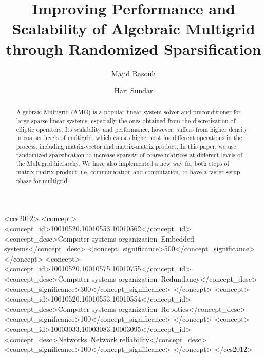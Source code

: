 \documentclass[sigconf]{acmart}
\begin{document}
\title{Improving Performance and Scalability of Algebraic Multigrid through Randomized Sparsification}

\author{Majid Rasouli}

\author{Hari Sundar}




\begin{abstract}
Algebraic Multigrid (AMG) is a popular linear system solver and preconditioner
for large sparse linear systems, especially the ones obtained from the discretization of elliptic operators. Its scalability and performance, however, suffers from higher density in coarser levels of multigrid, which causes higher cost for different operations in the process, including matrix-vector and matrix-matrix product.
In this paper, we use randomized sparsification to increase sparsity of coarse
matrices at different levels of the Multigrid hierarchy. We have also implemented
a new way for both steps of matrix-matrix product, i.e. communication and computation, to have a faster setup phase for multigrid.
\end{abstract}

%
%
\iffalse
\begin{CCSXML}
<ccs2012>
 <concept>
  <concept_id>10010520.10010553.10010562</concept_id>
  <concept_desc>Computer systems organization~Embedded systems</concept_desc>
  <concept_significance>500</concept_significance>
 </concept>
 <concept>
  <concept_id>10010520.10010575.10010755</concept_id>
  <concept_desc>Computer systems organization~Redundancy</concept_desc>
  <concept_significance>300</concept_significance>
 </concept>
 <concept>
  <concept_id>10010520.10010553.10010554</concept_id>
  <concept_desc>Computer systems organization~Robotics</concept_desc>
  <concept_significance>100</concept_significance>
 </concept>
 <concept>
  <concept_id>10003033.10003083.10003095</concept_id>
  <concept_desc>Networks~Network reliability</concept_desc>
  <concept_significance>100</concept_significance>
 </concept>
</ccs2012>
\end{CCSXML}
\end{document}
